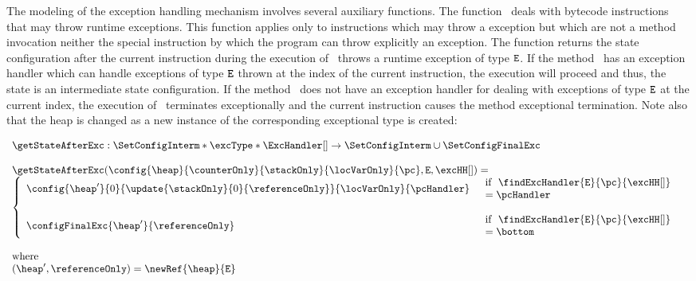  The modeling of the exception handling mechanism involves several auxiliary functions. 
 The function \getStateAfterExc \ deals with bytecode instructions that may throw runtime exceptions.
 This function applies only to instructions which may throw a \RuntimeExc{} exception  but which are not a method
 invocation neither the special instruction
 by which the program can throw explicitly an exception.
 The function returns the state  configuration after the current instruction during the execution of \methodd \ throws a runtime exception
 of type $\mbox{\rm\texttt{E}}$. If the  method \methodd \ has an  exception handler which can handle  exceptions of type
 $\mbox{\rm\texttt{E}}$ thrown at the index of the current  instruction,
 the execution will proceed and thus, the state is an intermediate state configuration.
 If the method \methodd \ does not have an exception handler for dealing with exceptions of type $\mbox{\rm\texttt{E}}$ 
 at the current index, the execution of \methodd \ terminates exceptionally and the current instruction
 causes the method exceptional termination. Note also that the heap is changed as a new instance of the corresponding exceptional 
 type is created:

 
 $$\begin{array}{l}
          \getStateAfterExc : \SetConfigInterm * \excType * \ExcHandler[] \rightarrow \SetConfigInterm \cup \SetConfigFinalExc  \\
	  \\
	  \getStateAfterExc( \config{\heap}{\counterOnly}{\stackOnly}{\locVarOnly}{\pc}, \mbox{\rm\texttt{E}},  \excHH[] ) = \\
          \left\{\begin{array}{ll}
	        \config{\heap'}{0}{\update{\stackOnly}{0}{\referenceOnly}}{\locVarOnly}{\pcHandler} & \begin{array}{l}  
                                                                                                           \mbox{\rm if \ \findExcHandler{\mbox{\rm\texttt{E}}}{\pc}{\excHH[]}} \\
													   =\pcHandler 
												      \end{array}	   
													   \\
		& \\
		\configFinalExc{\heap'}{\referenceOnly} & \begin{array}{l}     
		                                                             \mbox{\rm  if \ \findExcHandler{\mbox{\rm\texttt{E}}}{\pc}{\excHH[]} } \\
		                                                             = \bottom  
		                                                        \end{array}
	  \end{array}\right.\\
	  \\
        \mbox{\rm where }\\
	(\heap', \referenceOnly )= \newRef{\heap}{\mbox{\rm\texttt{E}}}
    \end{array}
 $$
 




